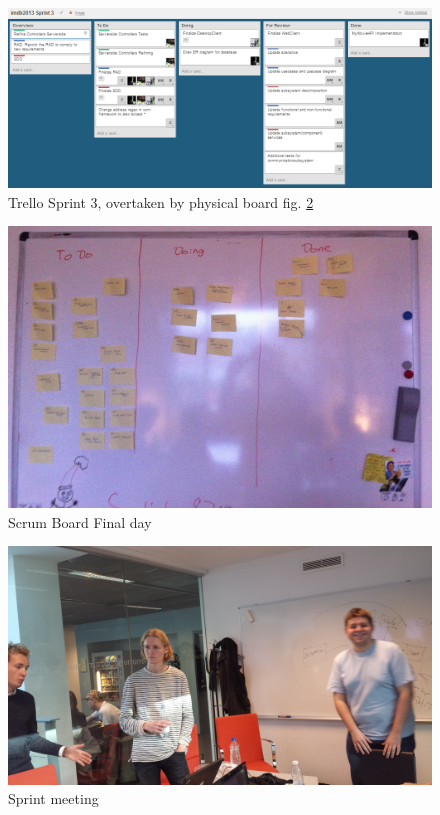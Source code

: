 \begin{figure}[h]
\begin{center}
\includegraphics[scale=0.5]{img/SCRUM/trelloSprint3.png}
\caption{Trello Sprint 3, overtaken by physical board fig. \ref{fig:Scrum Board1}}
\label{fig:Trello Sprint 3}
\end{center}
\end{figure}   

\begin{figure}[h]
\begin{center}
\includegraphics[scale=0.15]{img/SCRUM/scrumBoard1.jpg}
\caption{Scrum Board Final day}
\label{fig:Scrum Board1}
\end{center}
\end{figure} 

\begin{figure}[h]
\begin{center}
\includegraphics[scale=0.1]{img/SCRUM/standUp1.jpg}
\caption{Sprint meeting}
\label{fig:Sprint meeting}
\end{center}
\end{figure}

